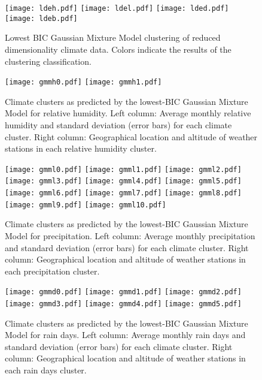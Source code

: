 \documentclass[12pt]{iopart}
\begin{document}
\begin{figure}
\begin{center}
\texttt{[image: ldeh.pdf]}
\texttt{[image: ldel.pdf]}
\texttt{[image: lded.pdf]}
\texttt{[image: ldeb.pdf]}
\caption{Lowest BIC Gaussian Mixture Model clustering of reduced dimensionality climate data. Colors indicate the results of the clustering classification.}\label{lde}
\end{center}
\end{figure}

\begin{figure}
\begin{center}
\texttt{[image: gmmh0.pdf]}
\texttt{[image: gmmh1.pdf]}
\caption{Climate clusters as predicted by the lowest-BIC Gaussian Mixture Model for relative humidity. Left column: Average monthly relative humidity and standard deviation (error bars) for each climate cluster. Right column: Geographical location and altitude of weather stations in each relative humidity cluster.}\label{clusth}
\end{center}
\end{figure}

\begin{figure}
\begin{center}
\texttt{[image: gmml0.pdf]}
\texttt{[image: gmml1.pdf]}
\texttt{[image: gmml2.pdf]}
\texttt{[image: gmml3.pdf]}
\texttt{[image: gmml4.pdf]}
\texttt{[image: gmml5.pdf]}
\texttt{[image: gmml6.pdf]}
\texttt{[image: gmml7.pdf]}
\texttt{[image: gmml8.pdf]}
\texttt{[image: gmml9.pdf]}
\texttt{[image: gmml10.pdf]}
\caption{Climate clusters as predicted by the lowest-BIC Gaussian Mixture Model for precipitation. Left column: Average monthly precipitation and standard deviation (error bars) for each climate cluster. Right column: Geographical location and altitude of weather stations in each precipitation cluster.}\label{clustl}
\end{center}
\end{figure}

\begin{figure}
\begin{center}
\texttt{[image: gmmd0.pdf]}
\texttt{[image: gmmd1.pdf]}
\texttt{[image: gmmd2.pdf]}
\texttt{[image: gmmd3.pdf]}
\texttt{[image: gmmd4.pdf]}
\texttt{[image: gmmd5.pdf]}
\caption{Climate clusters as predicted by the lowest-BIC Gaussian Mixture Model for rain days. Left column: Average monthly rain days and standard deviation (error bars) for each climate cluster. Right column: Geographical location and altitude of weather stations in each rain days cluster.}\label{clustl}
\end{center}
\end{figure}
\end{document}
